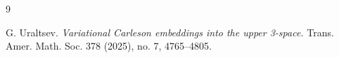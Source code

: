 \documentclass[12pt]{amsart}
\numberwithin{equation}{section}
\theoremstyle{definition}
\begin{document}
\begin{thebibliography}{9}









G. Uraltsev.
\emph{Variational Carleson embeddings into the upper 3-space.}
Trans. Amer. Math. Soc. 378 (2025), no. 7, 4765–4805.





\end{thebibliography}
\end{document}
